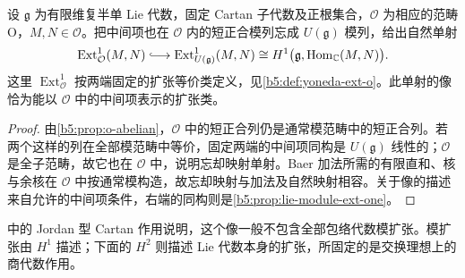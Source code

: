 \begin{corollary}\label{b5:cor:o-ext-forgetful}
	设 \(\mathfrak g\) 为有限维复半单 Lie 代数，固定 Cartan 子代数及正根集合，\(\mathcal O\) 为相应的范畴 O，\(M,N\in\mathcal O\)。把中间项也在 \(\mathcal O\) 内的短正合模列忘成 \(U(\mathfrak g)\) 模列，给出自然单射
	\[
		\operatorname{Ext}^1_{\mathcal O}(M,N) \lhook\joinrel\longrightarrow \operatorname{Ext}^1_{U(\mathfrak g)}(M,N) \cong H^1\bigl(\mathfrak g,\operatorname{Hom}_{\mathbb C}(M,N)\bigr).
	\]
	这里 \(\operatorname{Ext}^1_{\mathcal O}\) 按两端固定的扩张等价类定义，见\cref{b5:def:yoneda-ext-o}。此单射的像恰为能以 \(\mathcal O\) 中的中间项表示的扩张类。
\end{corollary}
\begin{proof}
	由\cref{b5:prop:o-abelian}，\(\mathcal O\) 中的短正合列仍是通常模范畴中的短正合列。若两个这样的列在全部模范畴中等价，固定两端的中间项同构是 \(U(\mathfrak g)\) 线性的；\(\mathcal O\) 是全子范畴，故它也在 \(\mathcal O\) 中，说明忘却映射单射。Baer 加法所需的有限直和、核与余核在 \(\mathcal O\) 中按通常模构造，故忘却映射与加法及自然映射相容。关于像的描述来自允许的中间项条件，右端的同构则是\cref{b5:prop:lie-module-ext-one}。
\end{proof}

中的 Jordan 型 Cartan 作用说明，这个像一般不包含全部包络代数模扩张。模扩张由 \(H^1\) 描述；下面的 \(H^2\) 则描述 Lie 代数本身的扩张，所固定的是交换理想上的商代数作用。

